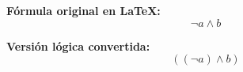 \documentclass{article}
\begin{document}
\textbf{Fórmula original en LaTeX:}
\[
\lnot a \land b 
\]

\textbf{Versión lógica convertida:}
\[
( ( \lnot a ) \land b )
\]
\end{document}
